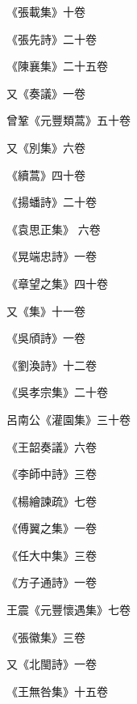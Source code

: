 \begin{pinyinscope}
 《張載集》十卷



 《張先詩》二十卷



 《陳襄集》二十五卷



 又《奏議》一卷



 曾鞏《元豐類蒿》五十卷



 又《別集》六卷



 《續蒿》四十卷



 《揚蟠詩》二十卷



 《袁思正集》
 六卷



 《晃端忠詩》一卷



 《章望之集》四十卷



 又《集》十一卷



 《吳頎詩》一卷



 《劉渙詩》十二卷



 《吳孝宗集》二十卷



 呂南公《灌園集》三十卷



 《王韶奏議》六卷



 《李師中詩》三卷



 《楊繪諫疏》七卷



 《傅翼之集》一卷



 《任大中集》三卷



 《方子通詩》一卷



 王震《元豐懷遇集》七卷



 《張徽集》三卷



 又《北閩詩》一卷



 《王無咎集》十五卷




\end{pinyinscope}
